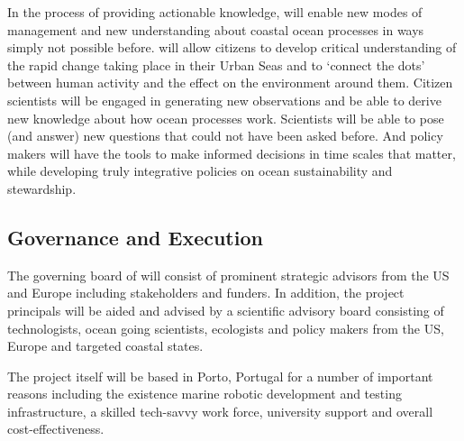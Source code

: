 \documentclass[12pt]{article}
\begin{document}
In the process of providing actionable knowledge, \pro will enable new
modes of management and new understanding about coastal ocean
processes in ways simply not possible before. \pro will allow citizens
to develop critical understanding of the rapid change taking place in
their Urban Seas and to ‘connect the dots’ between human activity and
the effect on the environment around them. Citizen scientists will be
engaged in generating new observations and be able to derive new
knowledge about how ocean processes work. Scientists will be able to
pose (and answer) new questions that could not have been asked
before. And policy makers will have the tools to make informed
decisions in time scales that matter, while developing truly
integrative policies on ocean sustainability and
stewardship. %




\subsection{Governance and Execution}

The governing board of \pro will consist of prominent strategic
advisors from the US and Europe including stakeholders and funders. In
addition, the project principals will be aided and advised by a
scientific advisory board consisting of technologists, ocean going
scientists, ecologists and policy makers from the US, Europe and
targeted coastal states. 

The project itself will be based in Porto, Portugal for a number of
important reasons including the existence marine robotic development
and testing infrastructure, a skilled tech-savvy work force,
university support and overall cost-effectiveness.
\end{document}
